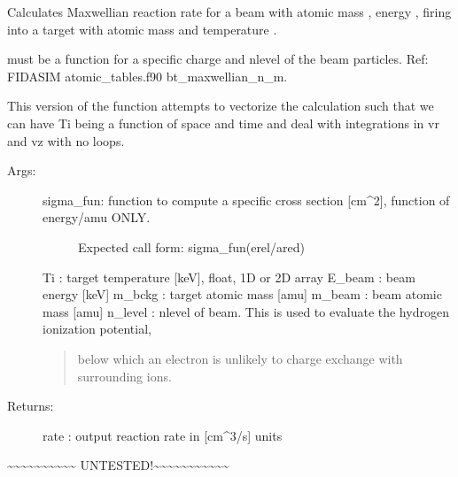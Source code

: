 \documentclass[letterpaper,10pt,english]{sphinxmanual}
\begin{document}
\begin{fulllineitems}
\label{\detokenize{aurora:aurora.nbi_neutrals.bt_rate_maxwell_average_vec}}
Calculates Maxwellian reaction rate for a beam with atomic mass , 
energy , firing into a target with atomic mass  and temperature .

 must be a function for a specific charge and n\sphinxhyphen{}level of the beam particles.
Ref: FIDASIM atomic\_tables.f90 bt\_maxwellian\_n\_m.

This version of the function attempts to vectorize the calculation such that we can have Ti
being a function of space and time and deal with integrations in vr and vz with no loops.
\begin{description}
\item[{Args:}] \leavevmode\begin{description}
\item[{sigma\_fun: function to compute a specific cross section {[}cm\textasciicircum{}2{]}, function of energy/amu ONLY.}] \leavevmode
Expected call form: sigma\_fun(erel/ared)

\end{description}

Ti : target temperature {[}keV{]}, float, 1D or 2D array
E\_beam : beam energy {[}keV{]}
m\_bckg : target atomic mass {[}amu{]}
m\_beam : beam atomic mass {[}amu{]}
n\_level : n\sphinxhyphen{}level of beam. This is used to evaluate the hydrogen ionization potential,
\begin{quote}

below which an electron is unlikely to charge exchange with surrounding ions.
\end{quote}

\item[{Returns:}] \leavevmode
rate : output reaction rate in {[}cm\textasciicircum{}3/s{]} units

\end{description}

\textasciitilde{}\textasciitilde{}\textasciitilde{}\textasciitilde{}\textasciitilde{}\textasciitilde{}\textasciitilde{}\textasciitilde{}\textasciitilde{}\textasciitilde{} UNTESTED!\textasciitilde{}\textasciitilde{}\textasciitilde{}\textasciitilde{}\textasciitilde{}\textasciitilde{}\textasciitilde{}\textasciitilde{}\textasciitilde{}\textasciitilde{}\textasciitilde{}

\end{fulllineitems}
\end{document}
